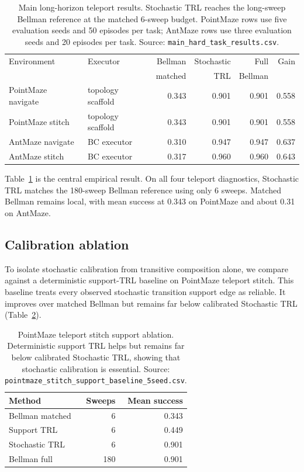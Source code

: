 \documentclass[10pt]{article}
\begin{document}
\begin{table}[t]
\centering
\caption{Main long-horizon teleport results. Stochastic TRL reaches the
long-sweep Bellman reference at the matched 6-sweep budget. PointMaze rows use
five evaluation seeds and 50 episodes per task; AntMaze rows use three
evaluation seeds and 20 episodes per task. Source:
\texttt{main\_hard\_task\_results.csv}.}
\label{tab:main}
\begin{tabular}{llrrrr}
\toprule
Environment & Executor & Bellman & Stochastic & Full & Gain\\
 & & matched & TRL & Bellman & \\
\midrule
PointMaze navigate & topology scaffold & 0.343 & 0.901 & 0.901 & 0.558\\
PointMaze stitch & topology scaffold & 0.343 & 0.901 & 0.901 & 0.558\\
AntMaze navigate & BC executor & 0.310 & 0.947 & 0.947 & 0.637\\
AntMaze stitch & BC executor & 0.317 & 0.960 & 0.960 & 0.643\\
\bottomrule
\end{tabular}
\end{table}

Table~\ref{tab:main} is the central empirical result. On all four teleport
diagnostics, Stochastic TRL matches the 180-sweep Bellman reference using only
6 sweeps. Matched Bellman remains local, with mean success at 0.343 on
PointMaze and about 0.31 on AntMaze.

\subsection{Calibration ablation}

To isolate stochastic calibration from transitive composition alone, we compare
against a deterministic support-TRL baseline on PointMaze teleport stitch. This
baseline treats every observed stochastic transition support edge as reliable.
It improves over matched Bellman but remains far below calibrated Stochastic
TRL (Table~\ref{tab:support}).

\begin{table}[t]
\centering
\caption{PointMaze teleport stitch support ablation. Deterministic support TRL
helps but remains far below calibrated Stochastic TRL, showing that stochastic
calibration is essential. Source:
\texttt{pointmaze\_stitch\_support\_baseline\_5seed.csv}.}
\label{tab:support}
\begin{tabular}{lrr}
\toprule
Method & Sweeps & Mean success\\
\midrule
Bellman matched & 6 & 0.343\\
Support TRL & 6 & 0.449\\
Stochastic TRL & 6 & 0.901\\
Bellman full & 180 & 0.901\\
\bottomrule
\end{tabular}
\end{table}
\end{document}
